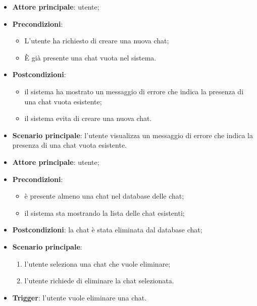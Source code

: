 \documentclass[10pt, a4paper]{article}
\begin{document}
    \begin{itemize}
        \item \textbf{Attore principale}: utente;
        \item \textbf{Precondizioni}:
        \begin{itemize}
            \item L’utente ha richiesto di creare una nuova chat;
            \item È già presente una chat vuota nel sistema.
        \end{itemize}
        \item \textbf{Postcondizioni}:
        \begin{itemize}
            \item il sistema ha mostrato un messaggio di errore che indica la presenza di una chat vuota esistente;
            \item il sistema evita di creare una nuova chat.
        \end{itemize}
        \item \textbf{Scenario principale}: l’utente visualizza un messaggio di errore che indica la presenza di una chat vuota esistente.
    \end{itemize}

    \begin{itemize}
        \item \textbf{Attore principale}: utente;
        \item \textbf{Precondizioni}: 
        \begin{itemize}
            \item è presente almeno una chat nel database delle chat;
            \item il sistema sta mostrando la lista delle chat esistenti;
        \end{itemize}
        \item \textbf{Postcondizioni}: la chat è stata eliminata dal database chat;
        \item \textbf{Scenario principale}:
        \begin{enumerate}
            \item l’utente seleziona una chat che vuole eliminare;
            \item l’utente richiede di eliminare la chat selezionata.
        \end{enumerate}
        \item \textbf{Trigger}: l’utente vuole eliminare una chat.
    \end{itemize}
\end{document}
